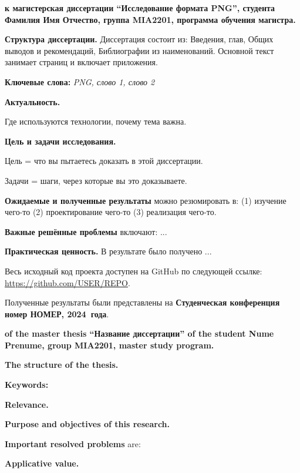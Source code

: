 \documentclass[a4paper,12pt]{report}
\newcommand{\thesisTitleEng}{Название диссертации} %
\newcommand{\uniGroupName}{MIA2201}
\newcommand{\authorName}{Nume Prenume} %
\newcommand{\thesisType}{master} %
\newcommand{\programulDeStudii}{master} %
\newcommand{\authorNameRu}{Фамилия Имя Отчество}
\newcommand{\thesisTitleRu}{Исследование формата PNG}
\newcommand{\thesisTypeRu}{магистерская} %
\newcommand{\programulDeStudiiRu}{магистра} %
\newcommand{\conferencesList}{Студенческая конференция номер НОМЕР, \year~года}
\renewcommand{\year}{2024}
\newcommand{\github}{\url{https://github.com/USER/REPO}}
\begin{document}
\titlePage

\clearpage
\tableofcontents

\clearpage
{} %

\textbf{к \thesisTypeRu{} диссертации ``\thesisTitleRu{}'', студента \authorNameRu{}, группа \uniGroupName{}, программа обучения \programulDeStudiiRu.}

\textbf{Структура диссертации.}
Диссертация состоит из: Введения, \chapterCount{} глав, Общих выводов и рекомендаций, Библиографии из \bibliographyEntryCount{} наименований.
Основной текст занимает \usefulPageCount{} страниц и включает \anexeCount{} приложения.

\textbf{Ключевые слова:}
\textit{\acs{PNG}, слово 1, слово 2}

\textbf{Актуальность.}

Где используются технологии, почему тема важна.

\textbf{Цель и задачи исследования.}

Цель = что вы пытаетесь доказать в этой диссертации.

Задачи = шаги, через которые вы это доказываете.

\textbf{Ожидаемые и полученные результаты} можно резюмировать в:
(1) изучение чего-то
(2) проектирование чего-то
(3) реализация чего-то.

\textbf{Важные решённые проблемы} включают: ...

\textbf{Практическая ценность.} В результате было получено ...

Весь исходный код проекта доступен на GitHub по следующей ссылке: \github.

Полученные результаты были представлены на \textbf{\conferencesList}\cite{self}.

\clearpage
{} %

\textbf{of the \thesisType{} thesis ``\thesisTitleEng'' of the student \authorName{}, group \uniGroupName{}, \programulDeStudii{} study program.}

\textbf{The structure of the thesis.}

\textbf{Keywords:}
\textit{}

\textbf{Relevance.}

\textbf{Purpose and objectives of this research.}

\textbf{Important resolved problems} are:

\textbf{Applicative value.} 
\end{document}
